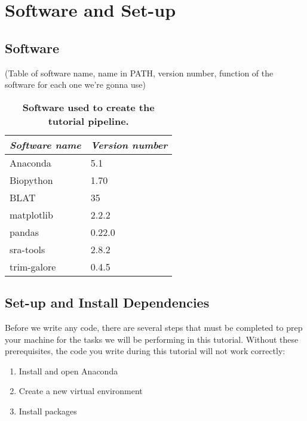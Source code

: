 \chapter{Software and Set-up}
\label{chap:software}
\section{Software}
(Table of software name, name in PATH, version number, function of the software for each one we're gonna use)
%
\begin{table}[htp]
    \begin{center}
    \begin{tabular}{ l | l }
        \textit{Software name} & \textit{Version number} \\ 
        \hline
        Anaconda & 5.1 \\  
        Biopython & 1.70 \\
        BLAT & 35 \\
        matplotlib & 2.2.2 \\
        pandas & 0.22.0 \\
        sra-tools & 2.8.2 \\
        trim-galore & 0.4.5 \\
    \end{tabular}
    \caption{\textbf{Software used to create the tutorial pipeline.}}
    \label{tab:software}
    \end{center}
    \label{software}
\end{table}
%
\section{Set-up and Install Dependencies}
Before we write any code, there are several steps that must be completed to prep your machine for the tasks we will be performing in this tutorial. Without these prerequisites, the code you write during this tutorial will not work correctly:
\begin{enumerate}
\item Install and open Anaconda
\item Create a new virtual environment
\item Install packages
\end{enumerate}

